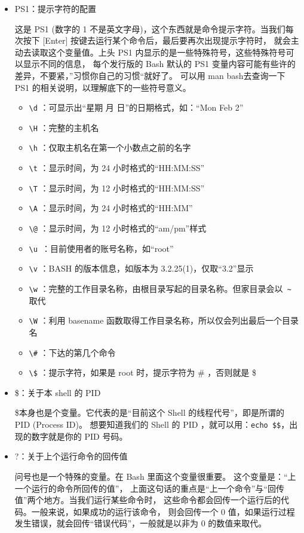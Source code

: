 \begin{itemize}
\item PS1：提示字符的配置

\qquad 这是 PS1 (数字的 1 不是英文字母)，这个东西就是命令提示字符。当我们每次按下 [Enter] 按键去运行某个命令后，最后要再次出现提示字符时， 就会主动去读取这个变量值。上头 PS1 内显示的是一些特殊符号，这些特殊符号可以显示不同的信息， 每个发行版的 Bash 默认的 PS1 变量内容可能有些许的差异，不要紧，”习惯你自己的习惯“就好了。 可以用 man bash去查询一下 PS1 的相关说明，以理解底下的一些符号意义。
\begin{itemize}
\item \verb|\d| ：可显示出“星期 月 日”的日期格式，如：“Mon Feb 2”
\item \verb|\H| ：完整的主机名
\item \verb|\h| ：仅取主机名在第一个小数点之前的名字
\item \verb|\t| ：显示时间，为 24 小时格式的“HH:MM:SS”
\item \verb|\T| ：显示时间，为 12 小时格式的“HH:MM:SS”
\item \verb|\A| ：显示时间，为 24 小时格式的“HH:MM”
\item \verb|\@| ：显示时间，为 12 小时格式的“am/pm”样式
\item \verb|\u |：目前使用者的账号名称，如“root”
\item \verb|\v| ：BASH 的版本信息，如版本为 3.2.25(1)，仅取“3.2”显示
\item \verb|\w| ：完整的工作目录名称，由根目录写起的目录名称。但家目录会以\verb| ~| 取代
\item \verb|\W| ：利用 basename 函数取得工作目录名称，所以仅会列出最后一个目录名
\item \verb|\#| ：下达的第几个命令
\item \verb|\$| ：提示字符，如果是 root 时，提示字符为 \# ，否则就是 \$ 
\end{itemize}

\item \$：关于本 shell 的 PID

\qquad \$本身也是个变量。它代表的是“目前这个 Shell 的线程代号”，即是所谓的 PID (Process ID)。 想要知道我们的 Shell 的 PID ，就可以用：\verb|echo $$|，出现的数字就是你的 PID 号码。

\item ?：关于上个运行命令的回传值

\qquad 问号也是一个特殊的变量。在 Bash 里面这个变量很重要。 这个变量是：“上一个运行的命令所回传的值”， 上面这句话的重点是“上一个命令”与“回传值”两个地方。当我们运行某些命令时， 这些命令都会回传一个运行后的代码。一般来说，如果成功的运行该命令， 则会回传一个 0 值，如果运行过程发生错误，就会回传“错误代码”，一般就是以非为 0 的数值来取代。
\end{itemize}



